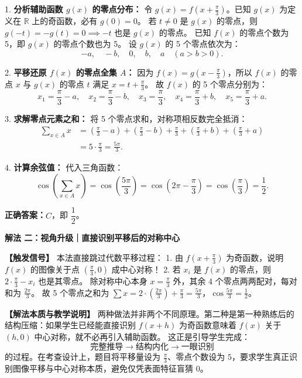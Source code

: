 \documentclass[11pt,a4paper,fontset=fandol]{ctexart}
\newcommand{\ans}[1]{\boxed{#1}}
\newcommand{\method}[1]{\par\medskip\noindent\textbf{解法 #1}\par}
\begin{document}
1. \textbf{分析辅助函数 $g(x)$ 的零点分布：}
令 $g(x) = f\left(x + \frac{\pi}{3}\right)$。已知 $g(x)$ 为定义在 $\mathbb{R}$ 上的奇函数，必有 $g(0) = 0$。
若 $t \ne 0$ 是 $g(x)$ 的零点，则 $g(-t) = -g(t) = 0 \implies -t$ 也是 $g(x)$ 的零点。
已知 $f(x)$ 的零点个数为 5，即 $g(x)$ 的零点个数也为 5。
设 $g(x)$ 的 5 个零点依次为：
\[
-a, \quad -b, \quad 0, \quad b, \quad a \quad (a > b > 0).
\]

2. \textbf{平移还原 $f(x)$ 的零点全集 $A$：}
因为 $f(x) = g\left(x - \frac{\pi}{3}\right)$，所以 $f(x)$ 的零点 $x$ 与 $g(x)$ 的零点 $t$ 满足 $x = t + \frac{\pi}{3}$。
故 $f(x)$ 的 5 个零点分别为：
\[
x_1 = \frac{\pi}{3} - a, \quad x_2 = \frac{\pi}{3} - b, \quad x_3 = \frac{\pi}{3}, \quad x_4 = \frac{\pi}{3} + b, \quad x_5 = \frac{\pi}{3} + a.
\]

3. \textbf{求解零点元素之和：}
将 5 个零点求和，对称项相反数完全抵消：
\begin{align*}
\sum_{x \in A} x &= \left(\frac{\pi}{3} - a\right) + \left(\frac{\pi}{3} - b\right) + \frac{\pi}{3} + \left(\frac{\pi}{3} + b\right) + \left(\frac{\pi}{3} + a\right)\\[0.4em]
&= 5 \cdot \frac{\pi}{3} = \frac{5\pi}{3}.
\end{align*}

4. \textbf{计算余弦值：}
代入三角函数：
\[
\cos\left(\sum_{x \in A} x\right) = \cos\left(\frac{5\pi}{3}\right) = \cos\left(2\pi - \frac{\pi}{3}\right) = \cos\left(\frac{\pi}{3}\right) = \ans{\frac{1}{2}}.
\]

\begin{answerbox}
\textbf{正确答案：}\(\boxed{C}\)，即 \(\boxed{\dfrac{1}{2}}\)。
\end{answerbox}

\method{二：视角升级｜直接识别平移后的对称中心}

\noindent\textbf{【触发信号】}
本法直接跳过代数平移过程：
1. 由 $f\left(x + \frac{\pi}{3}\right)$ 为奇函数，说明 $f(x)$ 的图像关于点 $\left(\frac{\pi}{3}, 0\right)$ 成中心对称！
2. 若 $x_i$ 是 $f(x)$ 的零点，则 $2 \cdot \frac{\pi}{3} - x_i$ 也是其零点。
除对称中心本身 $x = \frac{\pi}{3}$ 外，其余 4 个零点两两配对，每对和为 $\frac{2\pi}{3}$。
故 5 个零点之和为 $\sum x = 2 \cdot \left(\frac{2\pi}{3}\right) + \frac{\pi}{3} = \frac{5\pi}{3}$，$\cos\frac{5\pi}{3} = \frac{1}{2}$。

\begin{note}
\textbf{【解法本质与教学说明】} 
两种做法并非两个不同原理。第二种是第一种熟练后的结构压缩：如果学生已经能直接识别 $f(x+h)$ 为奇函数意味着 $f(x)$ 关于 $(h,0)$ 中心对称，就不必再引入辅助函数。
这正是引导学生完成：
\[
\text{完整推导} \longrightarrow \text{结构内化} \longrightarrow \text{一眼识别}
\]
的过程。在考查设计上，题目将平移量设为 $\frac{\pi}{3}$、零点个数设为 $5$，要求学生真正识别图像平移与中心对称本质，避免仅凭表面特征盲猜 0。
\end{note}
\end{document}
